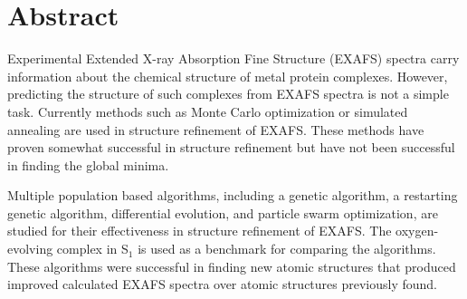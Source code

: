 \thispagestyle{empty}
\section*{Abstract}
\begin{doublespace}
Experimental Extended X-ray Absorption Fine Structure (EXAFS) spectra carry information about the chemical structure of metal protein complexes. However, predicting the structure of such complexes from EXAFS spectra is not a simple task. Currently methods such as Monte Carlo optimization or simulated annealing are used in structure refinement of EXAFS. These methods have proven somewhat successful in structure refinement but have not been successful in finding the global minima.

Multiple population based algorithms, including a genetic algorithm, a restarting genetic algorithm, differential evolution, and particle swarm optimization, are studied for their effectiveness in structure refinement of EXAFS. The oxygen-evolving complex in S$_{1}$ is used as a benchmark for comparing the algorithms. These algorithms were successful in finding new atomic structures that produced improved calculated EXAFS spectra over atomic structures previously found.

\end{doublespace}   

